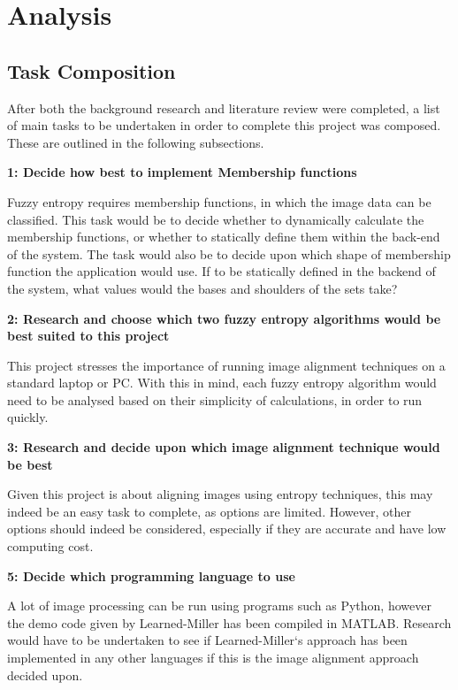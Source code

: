 \section{Analysis}

\subsection{Task Composition}

After both the background research and literature review were completed, a list of main tasks to be undertaken in order to complete this project was composed. These are outlined in the following subsections.

\noindent \textbf{1: Decide how best to implement Membership functions}

Fuzzy entropy requires membership functions, in which the image data can be classified. This task would be to decide whether to dynamically calculate the membership functions, or whether to statically define them within the back-end of the system. The task would also be to decide upon which shape of membership function the application would use. If to be statically defined in the backend of the system, what values would the bases and shoulders of the sets take?

\noindent \textbf{2: Research and choose which two fuzzy entropy algorithms would be best suited to this project}

This project stresses the importance of running image alignment techniques on a standard laptop or PC. With this in mind, each fuzzy entropy algorithm would need to be analysed based on their simplicity of calculations, in order to run quickly.

\noindent \textbf{3: Research and decide upon which image alignment technique would be best}

Given this project is about aligning images using entropy techniques, this may indeed be an easy task to complete, as options are limited. However, other options should indeed be considered, especially if they are accurate and have low computing cost.

\noindent \textbf{5: Decide which programming language to use}

A lot of image processing can be run using programs such as Python, however the demo code given by Learned-Miller \cite{joint-alignment} has been compiled in MATLAB. Research would have to be undertaken to see if Learned-Miller`s approach has been implemented in any other languages if this is the image alignment approach decided upon.

